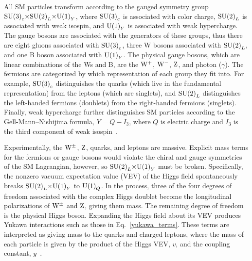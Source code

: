 \documentclass[12pt]{article}
\begin{document}
    All SM particles transform according to the gauged symmetry group $\mathrm{SU} {\left(3\right)}_c {\times} \mathrm{SU} {\left(2\right)}_L {\times} \mathrm{U} {\left(1\right)}_Y$, where $\mathrm{SU} {\left(3\right)}_c$ is associated with color charge, $\mathrm{SU} {\left(2\right)}_L$ is associated with weak isospin, and $\mathrm{U} {\left(1\right)}_Y$ is associated with weak hypercharge. The gauge bosons are associated with the generators of these groups, thus there are eight gluons associated with $\mathrm{SU} {\left(3\right)}_c$, three W bosons associated with $\mathrm{SU} {\left(2\right)}_L$, and one B boson associated with $\mathrm{U} {\left(1\right)}_Y$. The physical gauge bosons, which are linear combinations of the Ws and B, are the $\mathrm{W}^+$, $\mathrm{W}^-$, $\mathrm{Z}$, and photon ($\gamma$). The fermions are categorized by which representation of each group they fit into. For example, $\mathrm{SU} {\left(3\right)}_c$ distinguishes the quarks (which live in the fundamental representation) from the leptons (which are singlets), and $\mathrm{SU} {\left(2\right)}_L$ distinguishes the left-handed fermions (doublets) from the right-handed fermions (singlets). Finally, weak hypercharge further distinguishes SM particles according to the Gell-Mann--Nishijima formula, $Y=Q-I_3$, where $Q$ is electric charge and $I_3$ is the third component of weak isospin~\cite{sm_intro}.

    Experimentally, the $\mathrm{W}^\pm$, $\mathrm{Z}$, quarks, and leptons are massive. Explicit mass terms for the fermions or gauge bosons would violate the chiral and gauge symmetries of the SM Lagrangian, however, so $\mathrm{SU} {{\left(2\right)}}_L {\times} \mathrm{U} {\left(1\right)}_Y$ must be broken. Specifically, the nonzero vacuum expectation value (VEV) of the Higgs field spontaneously breaks $\mathrm{SU} {{\left(2\right)}}_L {\times} \mathrm{U} {\left(1\right)}_Y$ to $\mathrm{U} {\left(1\right)}_Q$. In the process, three of the four degrees of freedom associated with the complex Higgs doublet become the longitudinal polarizations of $\mathrm{W}^\pm$ and $\mathrm{Z}$, giving them mass. The remaining degree of freedom is the physical Higgs boson. Expanding the Higgs field about its VEV produces Yukawa interactions such as those in Eq.~\ref{yukawa_terms}. These terms are interpreted as giving mass to the quarks and charged leptons, where the mass of each particle is given by the product of the Higgs VEV, $v$, and the coupling constant, $y$~\cite{sm_intro}.
\end{document}
